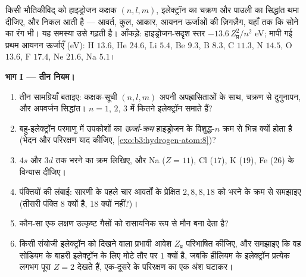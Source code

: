 \begin{problem}[{सप्ताहांत समस्या --- तीन क्वांटम नियम पूरा रसायन
गढ़ते हैं}]\label{pb:b3:identical-particles:1}
किसी भौतिकीविद् को हाइड्रोजन कक्षक $(n, l, m)$, इलेक्ट्रॉन का चक्रण
और पाउली का सिद्धांत थमा दीजिए, और  निकल आती है ---
आवर्त, कुल, आकार, आयनन ऊर्जाओं की ज़िगज़ैग, यहाँ तक कि सोने का रंग
भी। यह समस्या उसे गढ़ती है। आँकड़े: हाइड्रोजन-सदृश
स्तर $-13.6\,Z_{\text{प्र}}^2/n^2$ eV; मापी गई प्रथम आयनन
ऊर्जाएँ (eV): H $13.6$, He $24.6$, Li $5.4$, Be $9.3$, B $8.3$,
C $11.3$, N $14.5$, O $13.6$, F $17.4$, Ne $21.6$, Na $5.1$।

\medskip\noindent\textbf{भाग I --- तीन नियम।}
\begin{enumerate}
  \item तीन सामग्रियाँ बताइए: कक्षक-सूची
        $(n, l, m)$ अपनी अपह्रासिताओं के साथ, चक्रण से दुगुनापन, और
        अपवर्जन सिद्धांत। $n = 1$,
        $2$, $3$ में कितने इलेक्ट्रॉन समाते हैं?
  \item बहु-इलेक्ट्रॉन परमाणु में उपकोशों का \emph{ऊर्जा-क्रम}
        हाइड्रोजन के विशुद्ध-$n$ क्रम से भिन्न क्यों होता है
        (भेदन और परिरक्षण याद कीजिए,
        \cref{exo:b3:hydrogen-atom:8})?
  \item $4s$ और $3d$ तक भरने का क्रम लिखिए, और
        Na ($Z = 11$), Cl ($17$), K ($19$),
        Fe ($26$) के विन्यास दीजिए।
  \item पंक्तियों की लंबाई: सारणी के पहले चार आवर्तों के प्रेक्षित
        $2, 8, 8, 18$ को भरने के क्रम से समझाइए (तीसरी पंक्ति 8
        क्यों है, 18 क्यों नहीं?)।
  \item कौन-सा एक लक्षण उत्कृष्ट गैसों को रासायनिक रूप से मौन बना
        देता है?
  \item किसी संयोजी इलेक्ट्रॉन को दिखने वाला प्रभावी आवेश
        $Z_{\text{प्र}}$ परिभाषित कीजिए, और समझाइए कि वह सोडियम के
        बाहरी इलेक्ट्रॉन के लिए मोटे तौर पर $1$ क्यों है, जबकि
        हीलियम के इलेक्ट्रॉन प्रत्येक लगभग पूरा $Z = 2$ देखते हैं,
        एक-दूसरे के परिरक्षण का एक अंश घटाकर।
\end{enumerate}


\end{problem}
